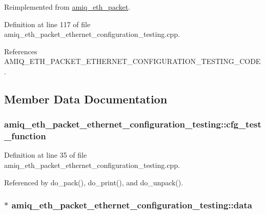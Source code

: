 Reimplemented from \hyperlink{classamiq__eth__packet_a6dd92751d8172eeaa347d71bb415b0d5}{amiq\_\-eth\_\-packet}.

Definition at line 117 of file amiq\_\-eth\_\-packet\_\-ethernet\_\-configuration\_\-testing.cpp.

References AMIQ\_\-ETH\_\-PACKET\_\-ETHERNET\_\-CONFIGURATION\_\-TESTING\_\-CODE.

\subsection{Member Data Documentation}
\hypertarget{classamiq__eth__packet__ethernet__configuration__testing_a8f0790eac9bf1d803112ce23788e4fc7}{
\subsubsection[{cfg\_\-test\_\-function}]{ {\bf amiq\_\-eth\_\-packet\_\-ethernet\_\-configuration\_\-testing::cfg\_\-test\_\-function}}}
\label{classamiq__eth__packet__ethernet__configuration__testing_a8f0790eac9bf1d803112ce23788e4fc7}


Definition at line 35 of file amiq\_\-eth\_\-packet\_\-ethernet\_\-configuration\_\-testing.cpp.

Referenced by do\_\-pack(), do\_\-print(), and do\_\-unpack().\hypertarget{classamiq__eth__packet__ethernet__configuration__testing_a93c7b061e19eafe5aa00fdf822e26008}{
\subsubsection[{data}]{$\ast$ {\bf amiq\_\-eth\_\-packet\_\-ethernet\_\-configuration\_\-testing::data}}}
\label{classamiq__eth__packet__ethernet__configuration__testing_a93c7b061e19eafe5aa00fdf822e26008}


